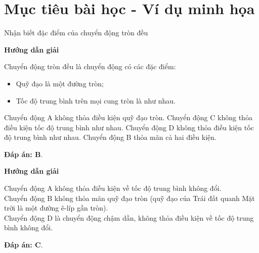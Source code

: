 \section{Mục tiêu bài học - Ví dụ minh họa}
\begin{dang}{Nhận biết đặc điểm của  chuyển động tròn đều}
	{	\begin{center}
			\textbf{Hướng dẫn giải}
		\end{center}
		
		Chuyển động tròn đều là chuyển động có các đặc điểm:
		\begin{itemize}
			\item Quỹ đạo là một đường tròn;
			\item Tốc độ trung bình trên mọi cung tròn là như nhau.
		\end{itemize}
		Chuyển động A không thỏa điều kiện quỹ đạo tròn. Chuyển động C không thỏa điều kiện tốc độ trung bình như nhau. Chuyển động D không thỏa điều kiện tốc độ trung bình như nhau. Chuyển động B thỏa mãn cả hai điều kiện. 
		
		\textbf{Đáp án: B}.
		
	}
	{	\begin{center}
			\textbf{Hướng dẫn giải}
		\end{center}
		Chuyển động A không thỏa điều kiện về tốc độ trung bình không đổi. \\
		Chuyển động B không thỏa mãn quỹ đạo tròn (quỹ đạo của Trái đất quanh Mặt trời là một đường ê-líp gần tròn).\\
		Chuyển động D là chuyển động chậm dần, không thỏa điều kiện về tốc độ trung bình không đổi. 
		
		\textbf{Đáp án: C}.
	}
	
\end{dang}
